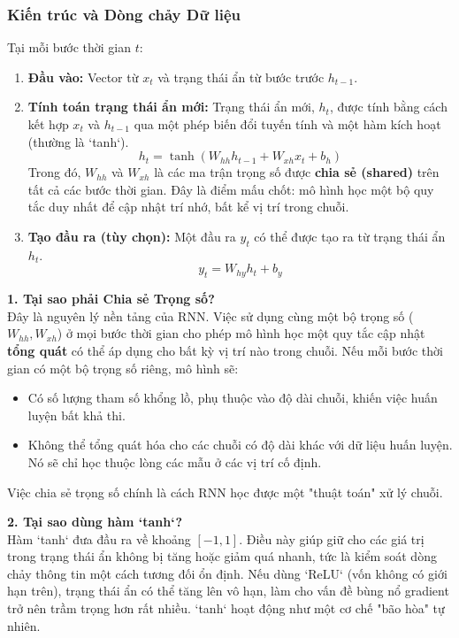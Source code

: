 \subsubsection{Kiến trúc và Dòng chảy Dữ liệu}
Tại mỗi bước thời gian $t$:
\begin{enumerate}
    \item \textbf{Đầu vào:} Vector từ $x_t$ và trạng thái ẩn từ bước trước $h_{t-1}$.
    \item \textbf{Tính toán trạng thái ẩn mới:} Trạng thái ẩn mới, $h_t$, được tính bằng cách kết hợp $x_t$ và $h_{t-1}$ qua một phép biến đổi tuyến tính và một hàm kích hoạt (thường là `tanh`).
        \begin{equation}
            h_t = \tanh(W_{hh} h_{t-1} + W_{xh} x_t + b_h)
        \end{equation}
        Trong đó, $W_{hh}$ và $W_{xh}$ là các ma trận trọng số được \textbf{chia sẻ (shared)} trên tất cả các bước thời gian. Đây là điểm mấu chốt: mô hình học một bộ quy tắc duy nhất để cập nhật trí nhớ, bất kể vị trí trong chuỗi.
    \item \textbf{Tạo đầu ra (tùy chọn):} Một đầu ra $y_t$ có thể được tạo ra từ trạng thái ẩn $h_t$.
        \begin{equation}
            y_t = W_{hy} h_t + b_y
        \end{equation}
\end{enumerate}
\begin{tcolorbox}[
    title=Ghi chú sâu về Thiết kế của RNN Đơn giản,
    colback=green!5!white, colframe=green!50!black, fonttitle=\bfseries
]
\textbf{1. Tại sao phải Chia sẻ Trọng số?} \\
Đây là nguyên lý nền tảng của RNN. Việc sử dụng cùng một bộ trọng số ($W_{hh}, W_{xh}$) ở mọi bước thời gian cho phép mô hình học một quy tắc cập nhật \textbf{tổng quát} có thể áp dụng cho bất kỳ vị trí nào trong chuỗi. Nếu mỗi bước thời gian có một bộ trọng số riêng, mô hình sẽ:
\begin{itemize}
    \item Có số lượng tham số khổng lồ, phụ thuộc vào độ dài chuỗi, khiến việc huấn luyện bất khả thi.
    \item Không thể tổng quát hóa cho các chuỗi có độ dài khác với dữ liệu huấn luyện. Nó sẽ chỉ học thuộc lòng các mẫu ở các vị trí cố định.
\end{itemize}
Việc chia sẻ trọng số chính là cách RNN học được một "thuật toán" xử lý chuỗi.

\textbf{2. Tại sao dùng hàm `tanh`?} \\
Hàm `tanh` đưa đầu ra về khoảng $[-1, 1]$. Điều này giúp giữ cho các giá trị trong trạng thái ẩn không bị tăng hoặc giảm quá nhanh, tức là kiểm soát dòng chảy thông tin một cách tương đối ổn định. Nếu dùng `ReLU` (vốn không có giới hạn trên), trạng thái ẩn có thể tăng lên vô hạn, làm cho vấn đề bùng nổ gradient trở nên trầm trọng hơn rất nhiều. `tanh` hoạt động như một cơ chế "bão hòa" tự nhiên.
\end{tcolorbox}

